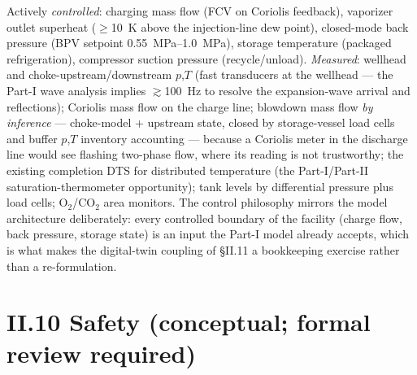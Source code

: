 Actively \emph{controlled}: charging mass flow (FCV on Coriolis
feedback), vaporizer outlet superheat ($\ge$\SI{10}{K} above the
injection-line dew point), closed-mode back pressure (BPV setpoint
\SIrange{0.55}{1.0}{MPa}), storage temperature (packaged
refrigeration), compressor suction pressure (recycle/unload).
\emph{Measured}: wellhead and choke-upstream/downstream $p$,$T$ (fast
transducers at the wellhead --- the Part-I wave analysis implies
$\gtrsim$\SI{100}{Hz} to resolve the expansion-wave arrival and
reflections); Coriolis mass flow on the charge line; blowdown mass
flow \emph{by inference} --- choke-model + upstream state, closed by
storage-vessel load cells and buffer $p$,$T$ inventory accounting ---
because a Coriolis meter in the discharge line would see flashing
two-phase flow, where its reading is not trustworthy; the existing
completion DTS for distributed temperature (the Part-I/Part-II
saturation-thermometer opportunity); tank levels by differential
pressure plus load cells; O$_2$/CO$_2$ area monitors. The control
philosophy mirrors the model architecture deliberately: every
controlled boundary of the facility (charge flow, back pressure,
storage state) is an input the Part-I model already accepts, which is
what makes the digital-twin coupling of \S II.11 a bookkeeping
exercise rather than a re-formulation.

\section{II.10 Safety (conceptual; formal review required)}

